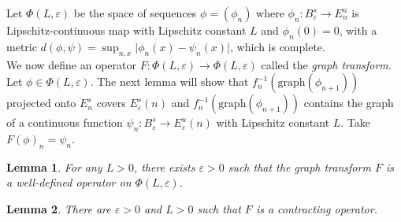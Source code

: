 \documentclass{article}
\newtheorem{lem}{Lemma}
\begin{document}
Let $\Phi(L, \varepsilon)$ be the space of sequences $\phi = (\phi_n)$ where $\phi_n:B^s_{\varepsilon} \to E^u_n$ is Lipschitz-continuous map with Lipschitz constant $L$ and $\phi_n(0) = 0$, with a metric $d(\phi,\psi)=\sup_{n,x} \vert \phi_n(x) - \psi_n(x) \vert$, which is complete. \\
\indent We now define an operator $F: \Phi(L,\varepsilon) \to \Phi(L, \varepsilon)$ called the \textit{graph transform}. Let $\phi \in \Phi(L,\varepsilon)$. The next lemma will show that $f^{-1}_n (\mathrm{graph}(\phi_{n+1}))$ projected onto $E^s_n$ covers $E^s_{\varepsilon}(n)$ and $f^{-1}_n(\mathrm{graph}(\phi_{n+1}))$ contains the graph of a continuous function $\psi_n: B^s_{\varepsilon} \to E^u_{\varepsilon}(n)$ with Lipschitz constant $L$. Take $F(\phi)_n = \psi_n$.

\begin{lem}
For any $L>0$, there exists $\varepsilon > 0$ such that the graph transform $F$ is a well-defined operator on $\Phi(L,\varepsilon)$.
\end{lem}

\begin{lem}
There are $\varepsilon >0$ and $L > 0$ such that $F$ is a contracting operator.
\end{lem}
\end{document}
